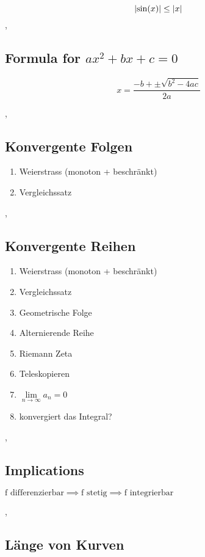 \[\left\lvert \sin(x) \right\rvert \leq \left\lvert x \right\rvert \]
\sep

\subsection{Formula for $a x^2 + b x + c = 0$}

\[ x = \frac{-b + \pm \sqrt{b^2 - 4 a c} }{2 a} \]

\sep

\subsection{Konvergente Folgen}
\begin{enumerate}
\item Weierstrass (monoton + beschränkt)
\item Vergleichssatz
\end{enumerate}

\sep

\subsection{Konvergente Reihen}

\begin{enumerate}
\item Weierstrass (monoton + beschränkt)
\item Vergleichssatz
\item Geometrische Folge
\item Alternierende Reihe
\item Riemann Zeta
\item Teleskopieren
\item $\lim \limits_{n \rightarrow \infty} a_n = 0$
\item konvergiert das Integral?
\end{enumerate}

\sep

\subsection{Implications}

\( \text{f differenzierbar} \implies \text{f stetig} \implies \text{f integrierbar} \)

\sep

\subsection{Länge von Kurven}

